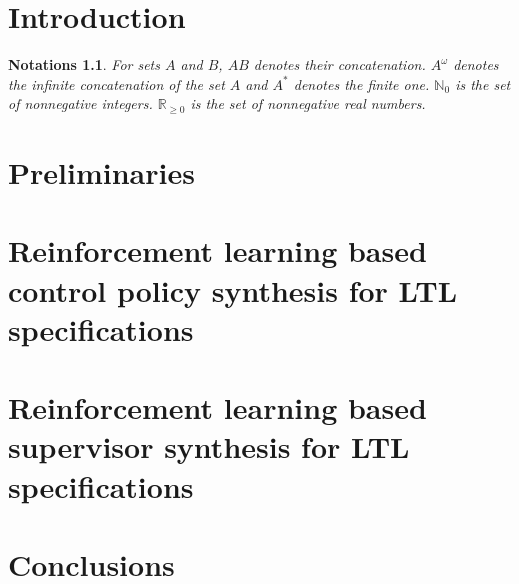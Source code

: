 \documentclass[a4j,12pt,oneside,openany,english,dvipdfmx]{jsbook}
\newtheorem{notations}{Notations}
\begin{document}
\clearpage
\tableofcontents
\clearpage
\setcounter{page}{0}

\chapter{Introduction}



\begin{notations}
  For sets $A$ and $B$, $AB$ denotes their concatenation. $A^{\omega}$ denotes the infinite concatenation of the set $A$ and $A^{\ast}$ denotes the finite one. $\mathbb{N}_0$ is the set of nonnegative integers. $\mathbb{R}_{\geq 0}$ is the set of nonnegative real numbers.
\end{notations}

\chapter{Preliminaries}



\chapter{Reinforcement learning based control policy synthesis for LTL specifications}



\chapter{Reinforcement learning based supervisor synthesis for LTL specifications}



\chapter{Conclusions}



\appendix
\end{document}
